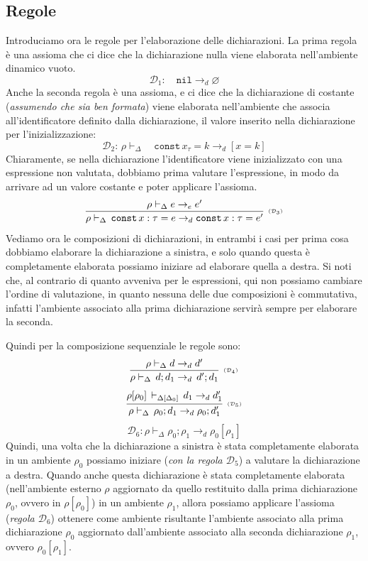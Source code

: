 \documentclass[oneside,a4paper,11pt]{book}
\theoremstyle{italicstyle}
\theoremstyle{normStyle}
\begin{document}
\subsection{Regole}
Introduciamo ora le regole per l’elaborazione delle dichiarazioni.
La prima regola è una assioma che ci dice che la dichiarazione nulla
viene elaborata nell'ambiente dinamico vuoto.
\[
  \mathcal{D}_1:\quad\texttt{nil}\rightarrow_d \varnothing
\]
Anche la seconda regola è una assioma, e ci dice che la dichiarazione
di costante (\textit{assumendo che sia ben formata}) viene elaborata
nell’ambiente che associa all’identificatore definito dalla
dichiarazione, il valore inserito nella dichiarazione per
l’inizializzazione:
\[
  \mathcal{D}_2:\,\rho \vdash_\Delta\quad\texttt{const} \,x_\tau = k\rightarrow_d [x=k]
\]
Chiaramente, se nella dichiarazione l’identificatore viene
inizializzato con una espressione non valutata, dobbiamo prima
valutare l’espressione, in modo da arrivare ad un valore costante
e poter applicare l’assioma.
\[
  \infer[\scriptscriptstyle (\mathcal{D}_{3})]
    {
      \rho \vdash_\Delta\,\texttt{const}\,x:\tau=e \rightarrow_d \texttt{const}\,x:\tau = e'
    }
    {
      \rho \vdash_\Delta e \rightarrow_e e'
    }
\]
Vediamo ora le composizioni di dichiarazioni, in entrambi i casi
per prima cosa dobbiamo elaborare la dichiarazione a sinistra, e
solo quando questa è completamente elaborata possiamo iniziare ad
elaborare quella a destra. Si noti che, al contrario di quanto
avveniva per le espressioni, qui non possiamo cambiare l’ordine
di valutazione, in quanto nessuna delle due composizioni
è commutativa, infatti l’ambiente associato alla prima dichiarazione
servirà sempre per elaborare la seconda.

Quindi per la composizione sequenziale le regole sono:
\[
  \infer[\scriptscriptstyle (\mathcal{D}_{4})]
    {
      \rho \vdash_\Delta\,d;d_1 \rightarrow_d \, d';d_1
    }
    {
      \rho \vdash_\Delta d \rightarrow_d d'
    }
\]
\[
  \infer[\scriptscriptstyle (\mathcal{D}_{5})]
    {
      \rho \vdash_\Delta\,\rho_0;d_1 \rightarrow_d \rho_0;d_1'
    }
    {
      \rho[\rho_0]\,\vdash_{\Delta[\Delta_0]}\,d_1 \rightarrow_d d_1'
    }
\]
\[
  \mathcal{D}_6: \rho \vdash_\Delta \rho_0;\rho_1 \rightarrow_d \rho_0[\rho_1]
\]
Quindi, una volta che la dichiarazione a sinistra è stata completamente elaborata in un ambiente $\rho_0$ possiamo
iniziare (\textit{con la regola $\mathcal{D}_5$}) a valutare la dichiarazione
a destra. Quando anche questa dichiarazione è stata completamente elaborata
(nell'ambiente esterno $\rho$
aggiornato da quello restituito dalla prima dichiarazione $\rho_0$, ovvero
in $\rho[\rho_0]$) in un ambiente $\rho_1$, allora possiamo
applicare l'assioma (\textit{regola $\mathcal{D}_6$}) ottenere come ambiente
risultante l'ambiente associato alla prima dichiarazione $\rho_0$ aggiornato dall'ambiente associato 
alla seconda dichiarazione $\rho_1$, ovvero $\rho_0[\rho_1]$.
\end{document}
